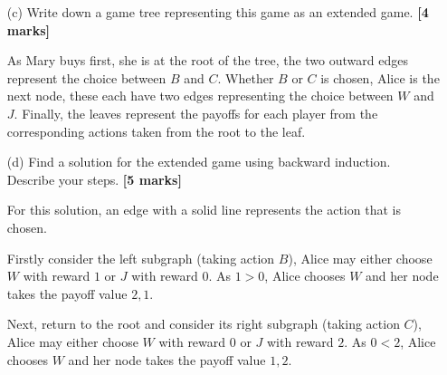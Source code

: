 \begin{enumerate}
    \item[(c)] Write down a game tree representing this game as an extended game.  \hfill{\bf [4 marks]}\smallskip

    As Mary buys first, she is at the root of the tree, the two outward edges represent the choice between $B$ and $C$.
    Whether $B$ or $C$ is chosen, Alice is the next node, these each have two edges representing the choice between $W$ and $J$.
    Finally, the leaves represent the payoffs for each player from the corresponding actions taken from the root to the leaf.

    \hfil
    \hfil

    \item[(d)] Find a solution for the extended game using backward induction.\\Describe your steps.  \hfill{\bf [5 marks]}\smallskip

    For this solution, an edge with a solid line represents the action that is chosen. 

    Firstly consider the left subgraph (taking action $B$), Alice may either choose $W$ with reward $1$ or $J$ with reward $0$.
    As $1 > 0$, Alice chooses $W$ and her node takes the payoff value $2,1$.

    \hfil
    \hfil

    Next, return to the root and consider its right subgraph (taking action $C$), Alice may either choose $W$ with reward $0$ or $J$ with reward $2$.
    As $0 < 2$, Alice chooses $W$ and her node takes the payoff value $1,2$.

    \hfil
    \hfil


\end{enumerate}
